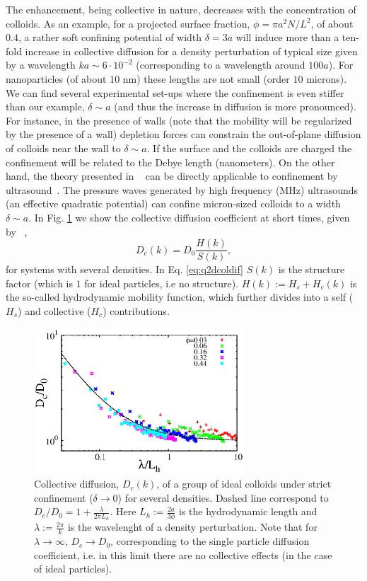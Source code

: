 \documentclass[ twoside,openright,titlepage,numbers=noenddot,%
headinclude,footinclude,cleardoublepage=empty,abstract=on,
BCOR=5mm,paper=b5,fontsize=11pt, dvipsnames
]{scrreprt}
\begin{document}
The enhancement, being collective in nature, decreases with the concentration of colloids. As an example, for a projected surface fraction, $\phi = \pi a^2N/L^2$, of about $0.4$, a rather soft confining potential of width $\delta = 3a$ will induce more than a ten-fold increase in collective diffusion for a density perturbation of typical size given by a wavelength $ka \sim 6\cdot 10^{-2}$ (corresponding to a wavelength around $100a$). For nanoparticles (of about $10$ nm) these lengths are not small (order $10$ microns). We can find several experimental set-ups where the confinement is even stiffer than our example, $\delta\sim a$ (and thus the increase in diffusion is more pronounced). For instance, in the presence of walls (note that the mobility will be regularized by the presence of a wall) depletion forces can constrain the out-of-plane diffusion of colloids near the wall to $\delta\sim a$. If the surface and the colloids are charged the confinement will be related to the Debye length (nanometers). On the other hand, the theory presented in ~\cite{Pelaez2017} can be directly applicable to confinement by ultrasound~\cite{Balboa2013}. The pressure waves generated by high frequency (MHz) ultrasounds (an effective quadratic potential) can confine micron-sized colloids to a width $\delta \sim a$.
In Fig. \ref{fig:q2DEnhancement} we show the collective diffusion coefficient at short times, given by ~\cite{Dhont1996},
\begin{equation}
  \label{eq:q2dcoldif}
  D_c(k) = D_0\frac{H(k)}{S(k)},
\end{equation}
for systems with several densities.
In Eq. \eqref{eq:q2dcoldif} $S(k)$ is the structure factor (which is $1$ for ideal particles, i.e no structure). $H(k):= H_s + H_c(k)$ is the so-called hydrodynamic mobility function, which further divides into a self ($H_s$) and collective ($H_c$) contributions.
\begin{figure}[H]
  \centering
  \includegraphics[width=0.7\textwidth]{gfx/q2DEnhancement}
  \caption{Collective diffusion, $D_c(k)$, of a group of ideal colloids under strict confinement ($\delta\rightarrow 0$) for several densities. Dashed line correspond to $D_c/D_0 = 1 + \frac{\lambda}{2\pi L_h}$. Here $L_h := \frac{2a}{3\phi}$ is the hydrodynamic length and $\lambda := \frac{2\pi}{k}$ is the wavelenght of a density perturbation. Note that for $\lambda \rightarrow \infty$, $D_c\rightarrow D_0$, corresponding to the single particle diffusion coefficient, i.e. in this limit there are no collective effects (in the case of ideal particles).}
  \label{fig:q2DEnhancement}
\end{figure}
\end{document}
